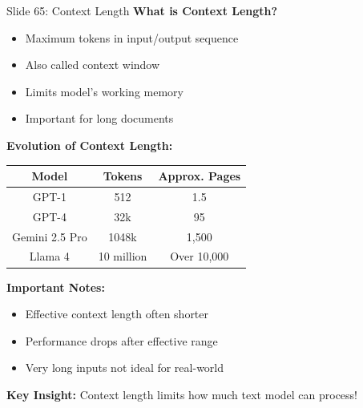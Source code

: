 \documentclass[8pt]{beamer}
\begin{document}
	\begin{frame}{Slide 65: Context Length}
		\fontsize{6.5}{7.5}\selectfont
		\textbf{What is Context Length?}
		\begin{itemize}
			\item Maximum tokens in input/output sequence
			\item Also called context window
			\item Limits model's working memory
			\item Important for long documents
		\end{itemize}
		
		\vspace{0.1cm}
		\textbf{Evolution of Context Length:}
		\begin{tabular}{|c|c|c|}
			\hline
			\textbf{Model} & \textbf{Tokens} & \textbf{Approx. Pages} \\
			\hline
			GPT-1 & 512 & 1.5 \\
			GPT-4 & 32k & 95 \\
			Gemini 2.5 Pro & 1048k & 1,500 \\
			Llama 4 & 10 million & Over 10,000 \\
			\hline
		\end{tabular}
		
		\vspace{0.1cm}
		\textbf{Important Notes:}
		\begin{itemize}
			\item Effective context length often shorter
			\item Performance drops after effective range
			\item Very long inputs not ideal for real-world
		\end{itemize}
		
		\textcolor{myblue}{\textbf{Key Insight:}} Context length limits how much text model can process!
	\end{frame}
	
\end{document}
